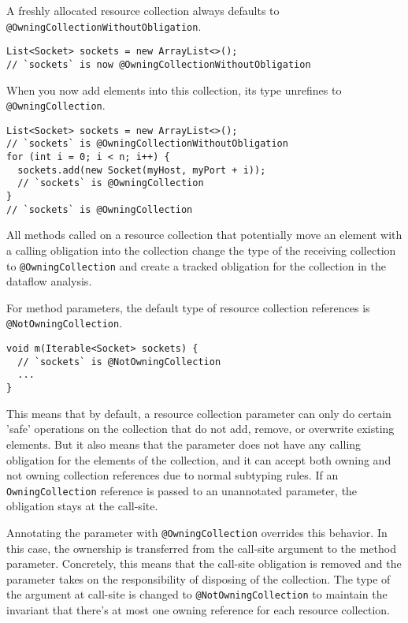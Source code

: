 
A freshly allocated resource collection always defaults to \texttt{@OwningCollectionWithoutObligation}.

\begin{Verbatim}
List<Socket> sockets = new ArrayList<>();
// `sockets` is now @OwningCollectionWithoutObligation
\end{Verbatim}

When you now add elements into this collection, its type unrefines to \texttt{@OwningCollection}.

\begin{Verbatim}
List<Socket> sockets = new ArrayList<>();
// `sockets` is @OwningCollectionWithoutObligation
for (int i = 0; i < n; i++) {
  sockets.add(new Socket(myHost, myPort + i));
  // `sockets` is @OwningCollection
}
// `sockets` is @OwningCollection
\end{Verbatim}

All methods called on a resource collection that potentially move an element with a calling obligation into the collection change the type of the receiving collection to \texttt{@OwningCollection} and create a tracked obligation for the collection in the dataflow analysis.

For method parameters, the default type of resource collection references is \texttt{@NotOwningCollection}.

\begin{Verbatim}
void m(Iterable<Socket> sockets) {
  // `sockets` is @NotOwningCollection
  ...
}
\end{Verbatim}

This means that by default, a resource collection parameter can only do certain 'safe' operations on the collection that do not add, remove, or overwrite existing elements. But it also means that the parameter does not have any calling obligation for the elements of the collection, and it can accept both owning and not owning collection references due to normal subtyping rules. If an \texttt{OwningCollection} reference is passed to an unannotated parameter, the obligation stays at the call-site.

Annotating the parameter with \texttt{@OwningCollection} overrides this behavior. In this case, the ownership is transferred from the call-site argument to the method parameter. Concretely, this means that the call-site obligation is removed and the parameter takes on the responsibility of disposing of the collection. The type of the argument at call-site is changed to \texttt{@NotOwningCollection} to maintain the invariant that there's at most one owning reference for each resource collection.


